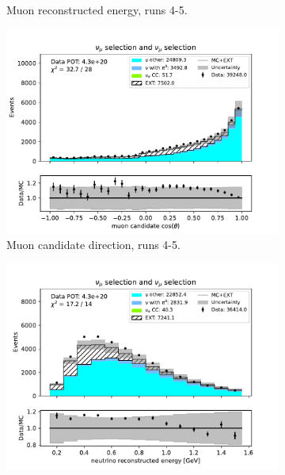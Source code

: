 \begin{figure}[H]
\begin{subfigure}{0.33\linewidth}
        \caption{Muon reconstructed energy, runs 4-5.}
    \end{subfigure}%
    \begin{subfigure}{0.33\linewidth}
        \captionsetup{width=0.6\linewidth}
        \includegraphics[width=\linewidth]{technote/Sidebands/Figures/NuMuSideband/muon_sideband_muon_theta_run4b4c4d5_NUMU_NUMU.pdf}
        \caption{Muon candidate direction, runs 4-5.}
    \end{subfigure}%
    \begin{subfigure}{0.33\linewidth}
        \captionsetup{width=0.7\linewidth}
        \includegraphics[width=\linewidth]{technote/Sidebands/Figures/NuMuSideband/muon_sideband_neutrino_energy_run4b4c4d5_NUMU_NUMU.pdf}

\end{subfigure}
\end{figure}
